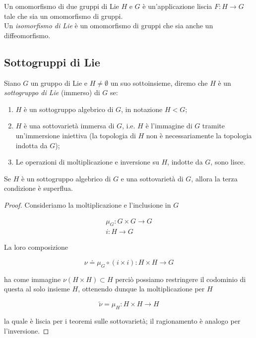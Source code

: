 Un omomorfismo di due gruppi di Lie $ H $ e $ G $ è un'applicazione liscia $ F : H \to G $ tale che sia un omomorfismo di gruppi.\\
Un \textit{isomorfismo di Lie} è un omomorfismo di gruppi che sia anche un diffeomorfismo.

\subsection{Sottogruppi di Lie}

Siano $ G $ un gruppo di Lie e $ H \neq \emptyset $ un suo sottoinsieme, diremo che $ H $ è un \textit{sottogruppo di Lie} (immerso) di $ G $ se:

\begin{enumerate}
	\item $ H $ è un sottogruppo algebrico di $ G $, in notazione $ H < G $;
	
	\item $ H $ è una sottovarietà immersa di $ G $, i.e. $ H $ è l'immagine di $ G $ tramite un'immersione iniettiva (la topologia di $ H $ non è necessariamente la topologia indotta da $ G $);
	
	\item Le operazioni di moltiplicazione e inversione su $ H $, indotte da $ G $, sono lisce.
\end{enumerate}

\begin{definition}
	Se $ H $ è un sottogruppo algebrico di $ G $ e una sottovarietà di $ G $, allora la terza condizione è superflua.
\end{definition}

\begin{proof}
	Consideriamo la moltiplicazione e l'inclusione in $ G $
	
	\begin{gather}
		\mu_{G} : G \times G \to G \\
		i : H \to G
	\end{gather}

	La loro composizione
	
	\begin{equation}
		\nu \doteq \mu_{G} \circ (i \times i) : H \times H \to G
	\end{equation}

	ha come immagine $ \nu (H \times H) \subset H $ perciò possiamo restringere il codominio di questa al solo insieme $ H $, ottenendo dunque la moltiplicazione per $ H $
	
	\begin{equation}
		\tilde{\nu} = \mu_{H} : H \times H \to H
	\end{equation}

	la quale è liscia per i teoremi sulle sottovarietà; il ragionamento è analogo per l'inversione.
\end{proof}

